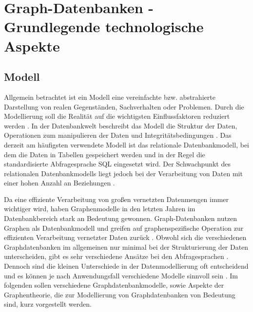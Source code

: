\chapter{Graph-Datenbanken - Grundlegende technologische Aspekte}
\section{Modell}
Allgemein betrachtet ist ein Modell eine vereinfachte bzw. abstrahierte Darstellung von realen Gegenständen, Sachverhalten oder Problemen.
Durch die Modellierung soll die Realität auf die wichtigsten Einflussfaktoren reduziert werden \cite{datamodels}.
In der Datenbankwelt beschreibt das Modell die Struktur der Daten, Operationen zum manipulieren der Daten und Integritätsbedingungen \cite{efcodd}.
Das derzeit am häufigsten verwendete Modell ist das relationale Datenbankmodell, bei dem die Daten in Tabellen gespeichert werden und in der Regel die standardisierte Abfragesprache \ac{SQL} eingesetzt wird.
Der Schwachpunkt des relationalen Datenbankmodells liegt jedoch bei der Verarbeitung von Daten mit einer hohen Anzahl an Beziehungen \cite{vicknair2010comparison}.

Da eine effiziente Verarbeitung von großen vernetzten Datenmengen immer wichtiger wird, haben Graphenmodelle in den letzten Jahren im Datenbankbereich stark an Bedeutung gewonnen.
Graph-Datenbanken nutzen Graphen als Datenbankmodell und greifen auf graphenspezifische Operation zur effizienten Verarbeitung vernetzter Daten zurück \cite{angles2008survey}.
Obwohl sich die verschiedenen Graphdatenbanken im allgemeinen nur minimal bei der Strukturierung der Daten unterscheiden, gibt es sehr verschiedene Ansätze bei den Abfragesprachen \cite{anglesintro}.
Dennoch sind die kleinen Unterschiede in der Datenmodellierung oft entscheidend und es können je nach Anwendungsfall verschiedene Modelle sinnvoll sein \cite{angles2012comparison}.
Im folgenden sollen verschiedene Graphdatenbankmodelle, sowie Aspekte der Graphentheorie, die zur Modellierung von Graphdatenbanken von Bedeutung sind, kurz vorgestellt werden.
\newpage
